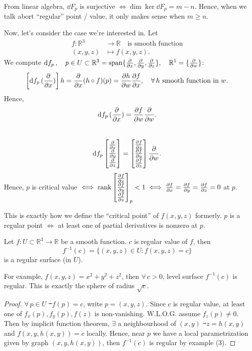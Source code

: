 From linear algebra, \(\dd{F_p}\) is surjective \(\iff \dim\ker\dd{F_p}=m-n\).
Hence, when we talk abort ``regular'' point / value, it only makes sense when
\(m\ge n\).

Now, let's consider the case we're interested in. Let
\begin{align*}
    f\colon\mathbb{R}^3 &\longrightarrow \mathbb{R}\quad\text{is smooth function} \\
    (x,y,z) &\longmapsto f(x,y,z)
.\end{align*}
We compute \(\dd{f_p},\quad p\in U\subset \mathbb{R}^3=\operatorname{span}\{\pdv{x},\pdv{y},
\pdv{z}\},\quad\mathbb{R}^1=\{\pdv{w}\}\): \[
    \left[ \dd{f_p}(\pdv{x}) \right] h=\pdv{x}(h\circ f)(p)=\pdv{h}{w}\pdv{f}{x},
    \quad\forall\, h\text{ smooth function in } w
.\]
Hence, \[
    \dd{f_p}(\pdv{x})=\pdv{f}{w}(p)\pdv{w}
.\] \ie\ \[
    \dd{f_p}\begin{bmatrix}
        \pdv{x} \\
        \pdv{y} \\
        \pdv{z}
    \end{bmatrix}
    =\begin{bmatrix}
        \pdv{f}{x} \\
        \pdv{f}{y} \\
        \pdv{f}{z}
    \end{bmatrix}\pdv{w}
.\] Hence, \(p\) is critical value \(\iff \rank\begin{bmatrix}
    \pdv{f}{x} \\
    \pdv{f}{y} \\
    \pdv{f}{z}
\end{bmatrix}_p<1
\iff \pdv{f}{x}=\pdv{f}{y}=\pdv{f}{z}=0\) at \(p\).

This is exactly how we define the ``critical point'' of \(f(x,y,z)\) formerly.
\(p\) is a regular point \(\iff \) at least one of partial derivatives is nonzero
at \(p\).

\begin{prop}
    Let \(f\colon U\subset\mathbb{R}^3\to \mathbb{R}\) be a smooth function. \(c\)
    is regular value of \(f\), then \[
        f^{-1}(c)=\{(x,y,z)\in U:f(x,y,z)=c\}
    \] is a regular surface (in \(U\)).
\end{prop}

For example, \(f(x,y,z)=x^2+y^2+z^2\), then \(\forall\,c>0\), level surface
\(f^{-1}(c)\) is regular. This is exactly the sphere of radius \(\sqrt{c}\).

\begin{proof}
    \(\forall\,p\in U\) \st\ \(f(p)=c\), write \(p=(x,y,z)\). Since \(c\) is regular
    value, at least one of \(f_x(p),f_y(p),f(z)\) is non-vanishing. W.L.O.G. assume
    \(f_z(p)\neq 0\). Then by implicit function theorem, \(\exists\) a neighbourhood
    of \((x,y)\) \st\ \(z=h(x,y)\) and \(f(x,y,h(x,y))=c\) locally.
    Hence, near \(p\) we have a local parametrization given by graph \((x,y,h(x,y))\),
    then \(f^{-1}(c)\) is regular by example (3).
\end{proof}

